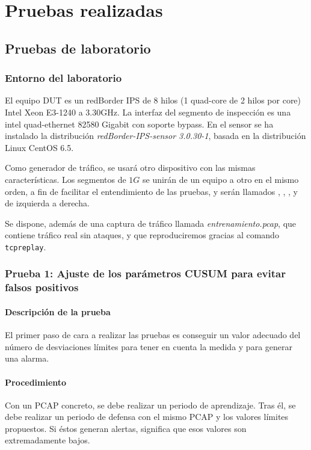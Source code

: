 \section{Pruebas realizadas}
\subsection{Pruebas de laboratorio}
\subsubsection{Entorno del laboratorio}

El equipo \gls{DUT} es un redBorder IPS de 8 hilos (1 quad-core de 2 hilos por core) Intel Xeon E3-1240 a 3.30GHz. La 
interfaz del segmento de inspección es una intel quad-ethernet 82580 Gigabit con soporte bypass. En el sensor se ha 
instalado la distribución \emph{redBorder-IPS-sensor 3.0.30-1}, basada en la distribución Linux CentOS 6.5.

Como generador de tráfico, se usará otro dispositivo con las mismas características. Los segmentos de $1G$ se unirán de 
un equipo a otro en el mismo orden, a fin de facilitar el entendimiento de las pruebas, y serán llamados 
, , , y  de izquierda a derecha.

Se dispone, además de una captura de tráfico llamada \emph{entrenamiento.pcap}, que contiene tráfico real sin ataques,
y que reproduciremos gracias al comando \texttt{tcpreplay}.

\subsubsection{Prueba 1: Ajuste de los parámetros CUSUM para evitar falsos positivos}
\paragraph{Descripción de la prueba}\mbox{}

El primer paso de cara a realizar las pruebas es conseguir un valor adecuado del número de desviaciones límites
para tener en cuenta la medida y para generar una alarma.

\paragraph{Procedimiento}\mbox{}

Con un PCAP concreto, se debe realizar un periodo de aprendizaje. Tras él, se debe realizar un
periodo de defensa con el mismo PCAP y los valores límites propuestos. Si éstos generan alertas,
significa que esos valores son extremadamente bajos.

